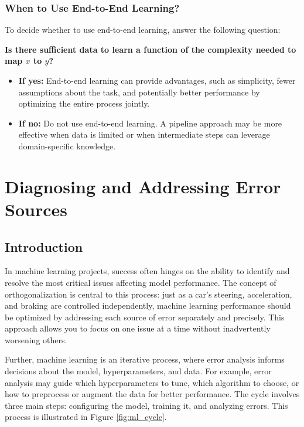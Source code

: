 \documentclass[12pt,openany]{book}
\begin{document}
\subsection{When to Use End-to-End Learning?}
To decide whether to use end-to-end learning, answer the following question: \newline

\textbf{Is there sufficient data to learn a function of the complexity needed to map \(x\) to \(y\)?} 
\begin{itemize}
    \item \textbf{If yes:} End-to-end learning can provide advantages, such as simplicity, fewer assumptions about the task, and potentially better performance by optimizing the entire process jointly.
    \item \textbf{If no:} Do not use end-to-end learning. A pipeline approach may be more effective when data is limited or when intermediate steps can leverage domain-specific knowledge.
\end{itemize}




\chapter{Diagnosing and Addressing Error Sources}

\section*{Introduction}

In machine learning projects, success often hinges on the ability to identify and resolve the most critical issues affecting model performance. The concept of orthogonalization is central to this process: just as a car’s steering, acceleration, and braking are controlled independently, machine learning performance should be optimized by addressing each source of error separately and precisely. This approach allows you to focus on one issue at a time without inadvertently worsening others. \newline

Further, machine learning is an iterative process, where error analysis informs decisions about the model, hyperparameters, and data. For example, error analysis may guide which hyperparameters to tune, which algorithm to choose, or how to preprocess or augment the data for better performance. The cycle involves three main steps: configuring the model, training it, and analyzing errors. This process is illustrated in Figure \ref{fig:ml_cycle}. \newline
\end{document}
